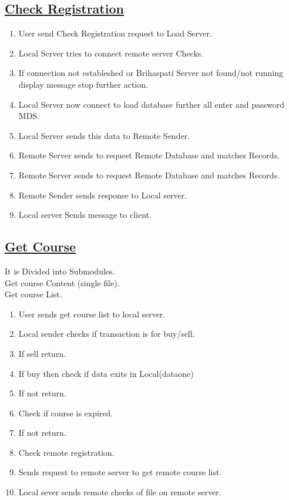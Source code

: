 \documentclass{article}
\begin{document}
\begin{center}
\section*{\underline{Check Registration}}
\end{center}
\begin{enumerate}
\item User send Check Registration request to Load Server.
\item Local Server tries to connect remote server Checks.
\item If connection not estableshed or Brihaspati Server not found/not running display message stop further action.
\item Local Server now connect to load database further all enter and password MDS.
\item Local Server sends this data to Remote Sender.
\item Remote Server sends to request Remote Database and matches Records.
\item Remote Server sends to request Remote Database and matches Records.
\item Remote Sender sends response to Local server.
\item Local server Sends message to client.
\end{enumerate}
\begin{center}

\label{figure:Checkreg.latex}
\end{center}
\subsection*{\underline{Get Course}}
It is Divided into Submodules.\\
Get course Content (single file).\\
Get course List.\\
\begin{enumerate}
\item User sends get course list to local server.
\item Local sender checks if transaction is for buy/sell.
\item If sell return.
\item If buy then check if data exits in Local(dataone)
\item If not return.
\item Check if course is expired.
\item If not return.
\item Check remote registration.
\item Sends request to remote server to get remote course list.
\item Local sever sends remote checks of file on remote server.
\end{enumerate}
\end{document}
